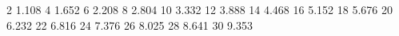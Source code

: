 2  1.108
4  1.652
6  2.208
8  2.804
10 3.332
12 3.888
14 4.468
16 5.152
18 5.676
20 6.232
22 6.816
24 7.376
26 8.025
28 8.641
30 9.353
